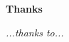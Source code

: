 \thispagestyle{empty}

\begin{center}
  {\bf \Huge Thanks}
\end{center}

\vspace{4cm}


\emph{
  ...thanks to...
}
